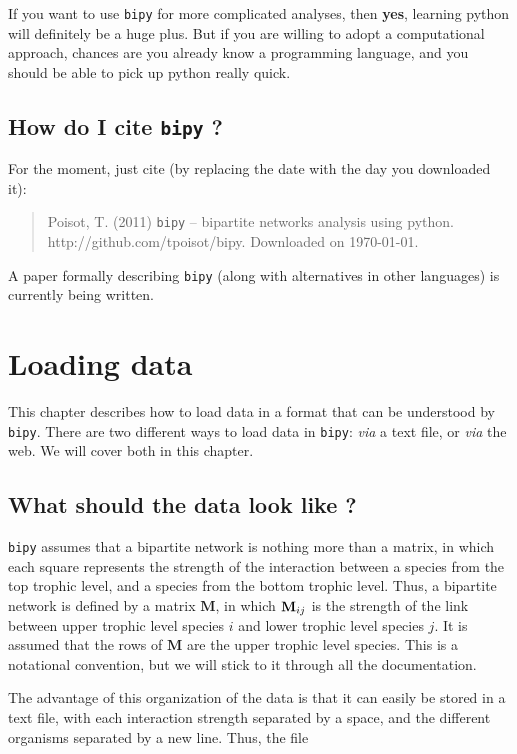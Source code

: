 \documentclass[10pt]{scrbook}
\begin{document}
If you want to use \texttt{bipy} for more complicated analyses, then \textbf{yes}, learning python will definitely be a huge plus. But if you are willing to adopt a computational approach, chances are you already know a programming language, and you should be able to pick up python really quick.

\section{How do I cite \texttt{bipy} ?}

For the moment, just cite (by replacing the date with the day you downloaded it):

\begin{quote}
	Poisot, T. (2011) \texttt{bipy} -- bipartite networks analysis using python. http://github.com/tpoisot/bipy. Downloaded on \today.
\end{quote}

A paper formally describing \texttt{bipy} (along with alternatives in other languages) is currently being written.

\chapter{Loading data}

This chapter describes how to load data in a format that can be understood by \texttt{bipy}. There are two different ways to load data in \texttt{bipy}: \emph{via} a text file, or \emph{via} the web. We will cover both in this chapter.

\section{What should the data look like ?}

\texttt{bipy} assumes that a bipartite network is nothing more than a matrix, in which each square represents the strength of the interaction between a species from the top trophic level, and a species from the bottom trophic level. Thus, a bipartite network is defined by a matrix $\mathbf{M}$, in which $\mathbf{M}\sb{ij}$ is the strength of the link between upper trophic level species $i$ and lower trophic level species $j$. It is assumed that the rows of $\mathbf{M}$ are the upper trophic level species. This is a notational convention, but we will stick to it through all the documentation.

The advantage of this organization of the data is that it can easily be stored in a text file, with each interaction strength separated by a space, and the different organisms separated by a new line. Thus, the file
\end{document}
